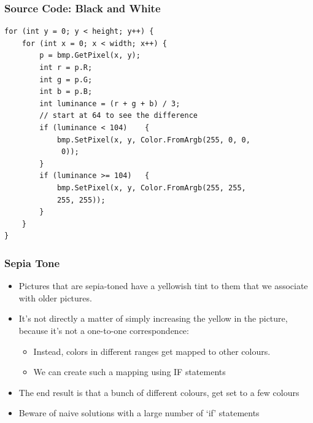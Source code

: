 \begin{frame}[fragile]
	\frametitle{Source Code: Black and White}
	
\begin{lstlisting}
for (int y = 0; y < height; y++) {
	for (int x = 0; x < width; x++)	{
		p = bmp.GetPixel(x, y);
		int r = p.R;
		int g = p.G;
		int b = p.B;
		int luminance = (r + g + b) / 3;
		// start at 64 to see the difference
		if (luminance < 104)	{
			bmp.SetPixel(x, y, Color.FromArgb(255, 0, 0,
			 0));
		}
		if (luminance >= 104)	{
		 	bmp.SetPixel(x, y, Color.FromArgb(255, 255, 
		 	255, 255));
		}
	}
}
\end{lstlisting}



\end{frame}

\begin{frame}
	\frametitle{Sepia Tone}
	
	\begin{itemize}		
		\item Pictures that are sepia-toned have a yellowish tint to them that we associate with older pictures.
		\item It's not directly a matter of simply increasing the yellow in the picture, because it's not a one-to-one correspondence:
		\begin{itemize}
			\item Instead, colors in different ranges get mapped to other colours.
			\item We can create such a mapping using IF statements
		\end{itemize}	
		\item The end result is that a bunch of different colours, get set to a few colours
		\item Beware of naive solutions with a large number of `if' statements
	\end{itemize}
\end{frame}



